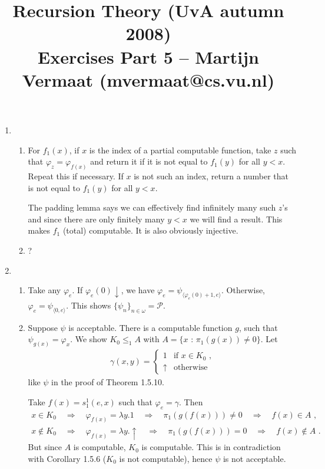 \documentclass[a4paper,11pt]{article}
\title{Recursion Theory (UvA autumn 2008)\\
\normalsize{Exercises Part 5 -- Martijn Vermaat (mvermaat@cs.vu.nl)}}
\date{}
\begin{document}
\maketitle


\begin{enumerate}[leftmargin=*,start=8,label=\textbf{Exercise 1.6.\arabic*}]


\item
\begin{enumerate}[label=(\alph*)]

\item
For $f_1(x)$, if $x$ is the index of a partial computable function, take
$z$ such that $\varphi_z = \varphi_{f(x)}$
and return it if it is not equal to $f_1(y)$ for all $y < x$.
Repeat this if necessary.
If $x$ is not such an index, return a number that is not equal to $f_1(y)$ for
all $y < x$.

The padding lemma says we can effectively find infinitely
many such $z$'s and since there are only finitely many $y < x$ we will find
a result. This makes $f_1$ (total) computable. It is also obviously injective.

\item
?

\end{enumerate}


\item
\begin{enumerate}[label=\arabic*.]
\item Take any $\varphi_e$.
If $\varphi_e(0)\downarrow$, we have $\varphi_e = \psi_{\langle \varphi_e(0)+1, e \rangle}$.
Otherwise, $\varphi_e = \psi_{\langle 0, e \rangle}$.
This shows $\{\psi_n\}_{n \in \omega} = \mathcal{P}$.

\item Suppose $\psi$ is acceptable.
There is a computable function $g$, such that $\psi_{g(x)} = \varphi_x$.
We show $K_0 \leq_1 A$ with $A = \{x \text{ : } \pi_1(g(x)) \neq 0 \}$.
Let
\begin{align*}
  \gamma(x, y) = \begin{cases}
    1        & \text{if $x \in K_0$ ,}\\
    \uparrow & \text{otherwise}
  \end{cases}
\end{align*}
like $\psi$ in the proof of Theorem 1.5.10.

Take $f(x) = s^1_1(e, x)$ such that $\varphi_e = \gamma$.
Then
\begin{align*}
  x \in K_0 \quad \Rightarrow \quad \varphi_{f(x)} = \lambda y.1 \quad \Rightarrow \quad \pi_1(g(f(x))) \neq 0 \quad \Rightarrow \quad f(x) \in A \text{ ,}\\
  x \notin K_0 \quad \Rightarrow \quad \varphi_{f(x)} = \lambda y.\uparrow \quad \Rightarrow \quad \pi_1(g(f(x))) = 0 \quad \Rightarrow \quad f(x) \notin A \text{ .}
\end{align*}
But since $A$ is computable, $K_0$ is computable.
This is in contradiction with Corollary 1.5.6 ($K_0$ is not computable), hence $\psi$ is not acceptable.
\end{enumerate}


\end{enumerate}
\end{document}
